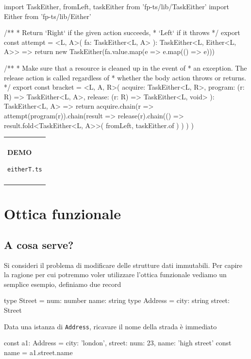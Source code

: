 \documentclass[12pt]{article}
\theoremstyle{definition}
\newenvironment{demo}
    {\begin{center}
    \begin{tabular}{|p{0.9\textwidth}|}
    \hline\\
    }
    {
    \\\\\hline
    \end{tabular}
    \end{center}
    }
\newenvironment{code}
  {\vspace{0.5cm} \VerbatimEnvironment\begin{typescriptcode}}
  {\end{typescriptcode} \vspace{0.2cm}}
\begin{document}
\begin{code}
import {
  TaskEither,
  fromLeft,
  taskEither
} from 'fp-ts/lib/TaskEither'
import { Either } from 'fp-ts/lib/Either'

/**
 * Return `Right` if the given action succeeds,
 * `Left` if it throws
 */
export const attempt = <L, A>(
  fa: TaskEither<L, A>
): TaskEither<L, Either<L, A>> => {
  return new TaskEither(fa.value.map(e => e.map(() => e)))
}

/**
 * Make sure that a resource is cleaned up in the event of
 * an exception. The release action is called regardless of
 * whether the body action throws or returns.
 */
export const bracket = <L, A, R>(
  acquire: TaskEither<L, R>,
  program: (r: R) => TaskEither<L, A>,
  release: (r: R) => TaskEither<L, void>
): TaskEither<L, A> => {
  return acquire.chain(r =>
    attempt(program(r)).chain(result =>
      release(r).chain(() =>
        result.fold<TaskEither<L, A>>(
          fromLeft,
          taskEither.of
        )
      )
    )
  )
}
\end{code}

\begin{demo}
\begin{center}
\textbf{DEMO}

\texttt{eitherT.ts}
\end{center}
\end{demo}

\newpage

\section{Ottica funzionale}

\subsection{A cosa serve?}

Si consideri il problema di modificare delle strutture dati immutabili.
Per capire la ragione per cui potremmo voler utilizzare l'ottica funzionale vediamo un semplice esempio, definiamo due record

\begin{code}
type Street = {
  num: number
  name: string
}
type Address = {
  city: string
  street: Street
}
\end{code}

Data una istanza di \texttt{Address}, ricavare il nome della strada è immediato

\begin{code}
const a1: Address = {
  city: 'london',
  street: { num: 23, name: 'high street' }
}
const name = a1.street.name
\end{code}
\end{document}
